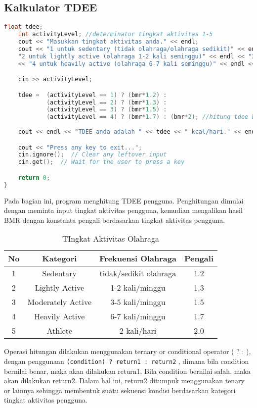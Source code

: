 \documentclass{article}
\begin{document}
\subsection{Kalkulator TDEE}
\begin{lstlisting}[language=c++]
    float tdee;
    int activityLevel; //determinator tingkat aktivitas 1-5
    cout << "Masukkan tingkat aktivitas anda." << endl;
    cout << "1 untuk sedentary (tidak olahraga/olahraga sedikit)" << endl <<
    "2 untuk lightly active (olahraga 1-2 kali seminggu)" << endl << "3 untuk moderately active (olahraga 3-5 kali seminggu)" << endl
    << "4 untuk heavily active (olahraga 6-7 kali seminggu)" << endl << "5 untuk atlet (olahraga 2 kali sehari)" << endl;

    cin >> activityLevel;

    tdee =  (activityLevel == 1) ? (bmr*1.2) :
            (activityLevel == 2) ? (bmr*1.3) :
            (activityLevel == 3) ? (bmr*1.5) :
            (activityLevel == 4) ? (bmr*1.7) : (bmr*2); //hitung tdee berdasarkan tingkat aktivitas
    
    cout << endl << "TDEE anda adalah " << tdee << " kcal/hari." << endl;

    cout << "Press any key to exit...";
    cin.ignore();  // Clear any leftover input
    cin.get();  // Wait for the user to press a key

    return 0;
}
\end{lstlisting}
Pada bagian ini, program menghitung TDEE pengguna. Penghitungan dimulai dengan meminta input tingkat aktivitas pengguna, kemudian mengalikan hasil BMR dengan konstanta pengali berdasarkan tingkat aktivitas pengguna.
\begin{table}[]
    \centering
    \begin{tabular}{|c|c|c|c|} \hline 
          No&Kategori &Frekuensi Olahraga&  Pengali\\ \hline 
          1& Sedentary&tidak/sedikit olahraga& 
     1.2\\ \hline
 2&  Lightly Active&1-2 kali/minggu&1.3\\\hline
 3&  Moderately Active&3-5 kali/minggu&1.5\\\hline
 4&  Heavily Active&6-7 kali/minggu&1.7\\\hline
 5&  Athlete&2 kali/hari&2.0\\\hline\end{tabular}
    \caption{TIngkat Aktivitas Olahraga}
    \label{tab:my_label}
\end{table}
Operasi hitungan dilakukan menggunakan ternary or conditional operator ( ? : ), dengan penggunaan \verb|(condition) ? return1 : return2| , dimana bila condition bernilai benar, maka akan dilakukan return1. Bila condition bernilai salah, maka akan dilakukan return2. Dalam hal ini, return2 ditumpuk menggunakan tenary or lainnya sehingga membentuk suatu sekuensi kondisi berdasarkan kategori tingkat aktivitas pengguna.
\end{document}
